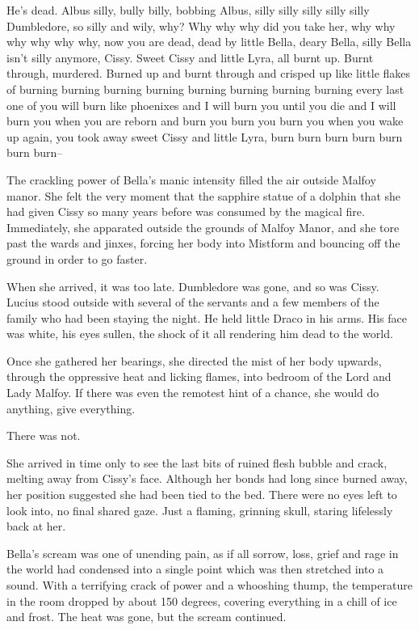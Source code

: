 
He’s dead. Albus silly, bully billy, bobbing Albus, silly silly silly silly silly Dumbledore, so silly and wily, why? Why why why did you take her, why why why why why why, now you are dead, dead by little Bella, deary Bella, silly Bella isn’t silly anymore, Cissy. Sweet Cissy and little Lyra, all burnt up. Burnt through, murdered. Burned up and burnt through and crisped up like little flakes of burning burning burning burning burning burning burning burning every last one of you will burn like phoenixes and I will burn you until you die and I will burn you when you are reborn and burn you burn you burn you when you wake up again, you took away sweet Cissy and little Lyra, burn burn burn burn burn burn burn–

The crackling power of Bella’s manic intensity filled the air outside Malfoy manor. She felt the very moment that the sapphire statue of a dolphin that she had given Cissy so many years before was consumed by the magical fire. Immediately, she apparated outside the grounds of Malfoy Manor, and she tore past the wards and jinxes, forcing her body into Mistform and bouncing off the ground in order to go faster.

When she arrived, it was too late. Dumbledore was gone, and so was Cissy. Lucius stood outside with several of the servants and a few members of the family who had been staying the night. He held little Draco in his arms. His face was white, his eyes sullen, the shock of it all rendering him dead to the world.

Once she gathered her bearings, she directed the mist of her body upwards, through the oppressive heat and licking flames, into bedroom of the Lord and Lady Malfoy. If there was even the remotest hint of a chance, she would do anything, give everything.

There was not.

She arrived in time only to see the last bits of ruined flesh bubble and crack, melting away from Cissy’s face. Although her bonds had long since burned away, her position suggested she had been tied to the bed. There were no eyes left to look into, no final shared gaze. Just a flaming, grinning skull, staring lifelessly back at her.

Bella’s scream was one of unending pain, as if all sorrow, loss, grief and rage in the world had condensed into a single point which was then stretched into a sound. With a terrifying crack of power and a whooshing thump, the temperature in the room dropped by about 150 degrees, covering everything in a chill of ice and frost. The heat was gone, but the scream continued.

